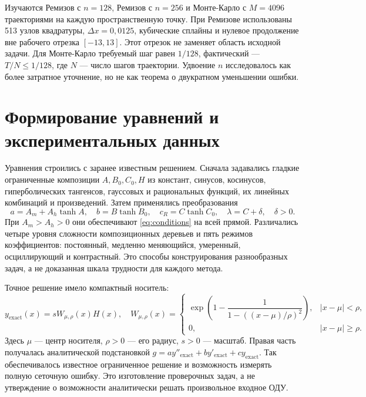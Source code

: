 Изучаются Ремизов с $n=128$, Ремизов с $n=256$ и Монте-Карло с $M=4096$ траекториями на каждую пространственную точку. При Ремизове использованы 513 узлов квадратуры, $\Delta x=0{,}0125$, кубические сплайны и нулевое продолжение вне рабочего отрезка $[-13,13]$. Этот отрезок не заменяет область исходной задачи. Для Монте-Карло требуемый шаг равен $1/128$, фактический --- $T/N\le1/128$, где $N$ --- число шагов траектории. Удвоение $n$ исследовалось как более затратное уточнение, но не как теорема о двукратном уменьшении ошибки.

\section{Формирование уравнений и экспериментальных данных}
Уравнения строились с заранее известным решением. Сначала задавались гладкие ограниченные композиции $A,B_0,C_0,H$ из констант, синусов, косинусов, гиперболических тангенсов, гауссовых и рациональных функций, их линейных комбинаций и произведений. Затем применялись преобразования
\begin{equation}\label{eq:construction}
a=A_m+A_h\tanh A,\quad b=B\tanh B_0,\quad
c_R=C\tanh C_0,\quad \lambda=C+\delta,\quad\delta>0.
\end{equation}
При $A_m>A_h>0$ они обеспечивают \eqref{eq:conditions} на всей прямой. Различались четыре уровня сложности композиционных деревьев и пять режимов коэффициентов: постоянный, медленно меняющийся, умеренный, осциллирующий и контрастный. Это способы конструирования разнообразных задач, а не доказанная шкала трудности для каждого метода.

Точное решение имело компактный носитель:
\begin{equation}\label{eq:manufactured}
y_{\mathrm{exact}}(x)=sW_{\mu,\rho}(x)H(x),\quad
W_{\mu,\rho}(x)=\begin{cases}\exp\!\left(1-\dfrac1{1-((x-\mu)/\rho)^2}\right),&|x-\mu|<\rho,\\0,&|x-\mu|\ge\rho.\end{cases}
\end{equation}
Здесь $\mu$ --- центр носителя, $\rho>0$ --- его радиус, $s>0$ --- масштаб. Правая часть получалась аналитической подстановкой $g=ay''_{\mathrm{exact}}+by'_{\mathrm{exact}}+cy_{\mathrm{exact}}$. Так обеспечивалось известное ограниченное решение и возможность измерять полную сеточную ошибку. Это изготовление проверочных задач, а не утверждение о возможности аналитически решать произвольное входное ОДУ.

